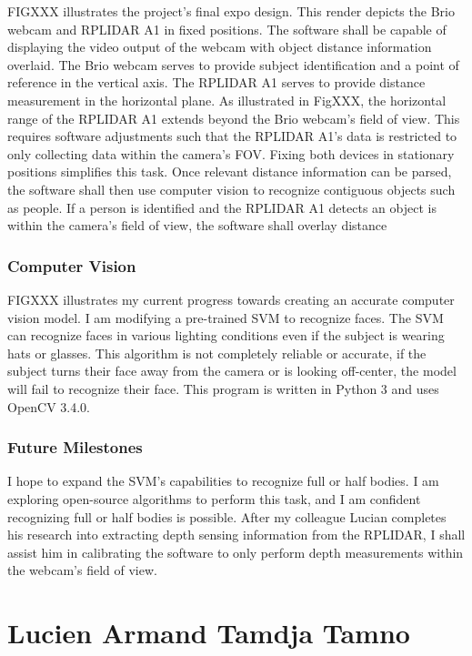 \documentclass[onecolumn, draftclsnofoot,10pt, compsoc]{IEEEtran}
\begin{document}
\begin{singlespace}
			FIGXXX illustrates the project’s final expo design.
			This render depicts the Brio webcam and RPLIDAR A1 in fixed positions.
			The software shall be capable of displaying the video output of the webcam with object distance information overlaid.
			The Brio webcam serves to provide subject identification and a point of reference in the vertical axis.
			The RPLIDAR A1 serves to provide distance measurement in the horizontal plane.
			As illustrated in FigXXX, the horizontal range of the RPLIDAR A1 extends beyond the Brio webcam’s field of view.
			This requires software adjustments such that the RPLIDAR A1’s data is restricted to only collecting data within the camera’s FOV.
			Fixing both devices in stationary positions simplifies this task.
			Once relevant distance information can be parsed, the software shall then use computer vision to recognize contiguous objects such as people.
			If a person is identified and the RPLIDAR A1 detects an object is within the camera’s field of view, the software shall overlay distance 
		
		\subsubsection{Computer Vision}
			FIGXXX illustrates my current progress towards creating an accurate computer vision model.
			I am modifying a pre-trained SVM to recognize faces.
			The SVM can recognize faces in various lighting conditions even if the subject is wearing hats or glasses.
			This algorithm is not completely reliable or accurate, if the subject turns their face away from the camera or is looking off-center, the model will fail to recognize their face.
			This program is written in Python 3 and uses OpenCV 3.4.0.

		\subsubsection{Future Milestones}
			I hope to expand the SVM’s capabilities to recognize full or half bodies.
			I am exploring open-source algorithms to perform this task, and I am confident recognizing full or half bodies is possible.
			After my colleague Lucian completes his research into extracting depth sensing information from the RPLIDAR, I shall assist him in calibrating the software to only perform depth measurements within the webcam’s field of view.


	\section{Lucien Armand Tamdja Tamno}
\end{singlespace}
\end{document}

